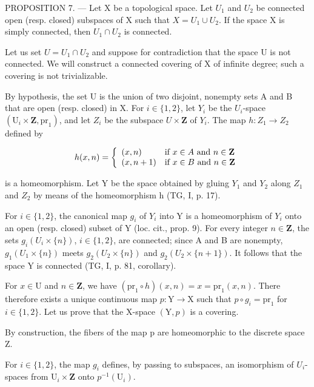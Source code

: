 PROPOSITION 7. — Let X be a topological space. Let \(U_{1}\) and \(U_{2}\) be connected open (resp. closed) subspaces of X such that \(X = U_{1} \cup U_{2}\). If the space X is simply connected, then \(U_{1} \cap U_{2}\) is connected.

Let us set \(U = U_{1} \cap U_{2}\) and suppose for contradiction that the space U is not connected. We will construct a connected covering of X of infinite degree; such a covering is not trivializable.

By hypothesis, the set U is the union of two disjoint, nonempty sets A and B that are open (resp. closed) in X. For \(i \in \{1, 2\}\), let \(Y_i\) be the \(U_i\)-space \((\mathrm{U}_i \times \mathbf{Z}, \mathrm{pr}_1)\), and let \(Z_i\) be the subspace \(U \times \mathbf{Z}\) of \(Y_i\). The map \(h: Z_1 \to Z_2\) defined by

\[
h (x, n) = \left\{ \begin{array}{l l} (x, n) & \text {if } x\in A \text { and } n\in \mathbf {Z} \\ (x, n + 1) & \text {if } x\in B \text { and } n\in \mathbf {Z} \end{array} \right.
\]

is a homeomorphism. Let Y be the space obtained by gluing \(Y_{1}\) and \(Y_{2}\) along \(Z_{1}\) and \(Z_{2}\) by means of the homeomorphism h (TG, I, p. 17).

For \(i \in \{1,2\}\), the canonical map \(g_i\) of \(Y_i\) into Y is a homeomorphism of \(Y_i\) onto an open (resp. closed) subset of Y (loc. cit., prop. 9). For every integer \(n \in \mathbf{Z}\), the sets \(g_i(U_i \times \{n\})\), \(i \in \{1,2\}\), are connected; since A and B are nonempty, \(g_1(U_1 \times \{n\})\) meets \(g_2(U_2 \times \{n\})\) and \(g_2(U_2 \times \{n+1\})\). It follows that the space Y is connected (TG, I, p. 81, corollary).

For \(x \in \mathrm{U}\) and \(n \in \mathbf{Z}\), we have \((\mathrm{pr}_1 \circ h)(x, n) = x = \mathrm{pr}_1(x, n)\). There therefore exists a unique continuous map \(p \colon \mathrm{Y} \to \mathrm{X}\) such that \(p \circ g_i = \mathrm{pr}_1\) for \(i \in \{1, 2\}\). Let us prove that the X-space \((\mathrm{Y}, p)\) is a covering.

By construction, the fibers of the map p are homeomorphic to the discrete space Z.

For \(i \in \{1,2\}\), the map \(g_i\) defines, by passing to subspaces, an isomorphism of \(U_i\)-spaces from \(\mathrm{U}_i \times \mathbf{Z}\) onto \(p^{-1}(\mathrm{U}_i)\).

